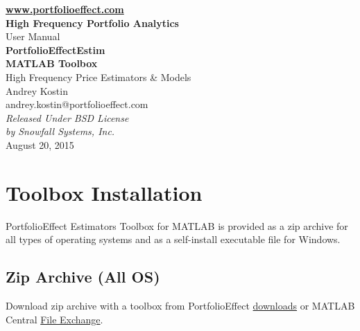 \documentclass[letterpaper]{report}
\begin{document}
\begin{titlepage}
\begin{center}
\vspace{5cm}
{\bfseries\href{https://www.portfolioeffect.com}{www.portfolioeffect.com} \\
High Frequency Portfolio Analytics\\}
\vspace{8cm}
{\huge User Manual \\}
\vspace{0.3cm}
{\Huge\bfseries PortfolioEffectEstim \\ MATLAB Toolbox \\}
\vspace{0.4cm}
{\Large High Frequency Price Estimators \& Models \\}
\vspace{1.5cm}
{Andrey Kostin \\ andrey.kostin@portfolioeffect.com} \\[14pt]
\vfill
\emph{{Released Under BSD License\\ by Snowfall Systems,
Inc.}}\\[2cm]
{August 20, 2015}
\end{center}
\end{titlepage}
 
\cleardoublepage
{}
{}
\renewcommand{\bibname}{Contents}
\tableofcontents 

\chapter{Toolbox Installation}
PortfolioEffect Estimators Toolbox for MATLAB is provided as a zip archive for
all types of operating systems and as a self-install executable file for Windows. 

\section{Zip Archive (All OS)}
Download zip archive with a toolbox from
PortfolioEffect
\href{https://www.portfolioeffect.com/docs/platform/quant/tools/matlab}{downloads}
or MATLAB Central
\href{http://www.mathworks.com/matlabcentral/fileexchange/55335-portfolioeffectestim-high-frequency-price-estimators---models-toolbox}{File Exchange}.
 
\end{document}
